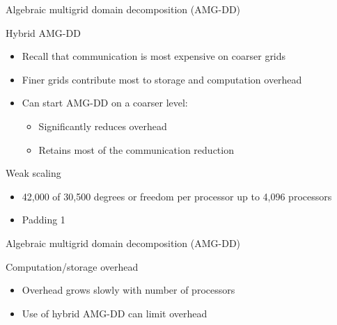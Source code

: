 \documentclass[18pt,xcolor=table]{beamer}
\begin{document}
\begin{frame}{Algebraic multigrid domain decomposition (AMG-DD)}


\begin{block}{Hybrid AMG-DD}
\begin{itemize}
\item Recall that communication is most expensive on coarser grids
\item Finer grids contribute most to storage and computation overhead
\item Can start AMG-DD on a coarser level:
\begin{itemize}
   \item Significantly reduces overhead 
   \item Retains most of the communication reduction
\end{itemize}
\end{itemize}
\end{block}

\begin{block}{Weak scaling}
\begin{itemize}
\item 42,000 of 30,500 degrees or freedom per processor up to 4,096 processors
\item Padding 1
\end{itemize}
\end{block}

\end{frame}

\begin{frame}{Algebraic multigrid domain decomposition (AMG-DD)}
\begin{block}{Computation/storage overhead}
\begin{itemize}
\item Overhead grows slowly with number of processors
\item Use of hybrid AMG-DD can limit overhead
\end{itemize}
\end{block}

\centering
\vspace{0.5 cm}

\end{frame}
\end{document}
